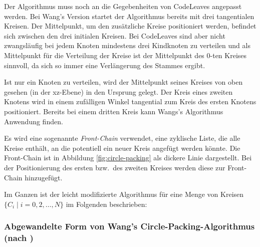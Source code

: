 Der Algorithmus muss noch an die Gegebenheiten von CodeLeaves angepasst werden. Bei Wang's Version startet der Algorithmus bereits mit drei tangentialen Kreisen. Der Mittelpunkt, um den zusätzliche Kreise positioniert werden, befindet sich zwischen den drei initialen Kreisen. Bei CodeLeaves sind aber nicht zwangsläufig bei jedem Knoten mindestens drei Kindknoten zu verteilen und als Mittelpunkt für die Verteilung der Kreise ist der Mittelpunkt des $0$-ten Kreises sinnvoll, da sich so immer eine Verlängerung des Stammes ergibt.

Ist nur ein Knoten zu verteilen, wird der Mittelpunkt seines Kreises von oben gesehen (in der xz-Ebene) in den Ursprung gelegt. Der Kreis eines zweiten Knotens wird in einem zufälligen Winkel tangential zum Kreis des ersten Knotens positioniert. Bereits bei einem dritten Kreis kann Wangs's Algorithmus Anwendung finden.

Es wird eine sogenannte \textit{Front-Chain} verwendet, eine zyklische Liste, die alle Kreise enthält, an die potentiell ein neuer Kreis angefügt werden könnte. Die Front-Chain ist in Abbildung \ref{fig:circle-packing} als dickere Linie dargestellt. Bei der Positionierung des ersten bzw.\ des zweiten Kreises werden diese zur Front-Chain hinzugefügt.

Im Ganzen ist der leicht modifizierte Algorithmus für eine Menge von Kreisen $\lbrace C_i \mid i = 0, 2, \dots , N \rbrace$ im Folgenden beschrieben:

\subsubsection*{Abgewandelte Form von Wang's Circle-Packing-Algorithmus (nach \cite{wang2006visualization})}

